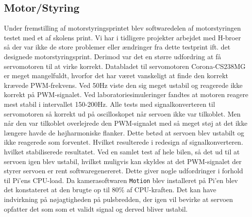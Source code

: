 \subsection{Motor/Styring} \label{sec:hwi_motor_styring}
Under fremstilling af motorstyringsprintet blev softwaredelen af motorstyringen testet med et af skolens print. 
Vi har i tidligere projekter arbejdet med H-broer så der var ikke de store problemer eller ændringer fra dette testprint ift. det designede motorstyringsprint.
Derimod var det en større udfordring at få servomotoren til at virke korrekt.  
Databladet til servomotoren Corona-CS238MG \cite{lib:Corona-CS238MG} er meget mangelfuldt, hvorfor det har været vanskeligt at finde den korrekt krævede PWM-frekvens. 
Ved 50Hz viste den sig meget ustabil og reagerede ikke korrekt på PWM-signalet. 
Ved laboratoriesimuleringer fandtes at motoren reagere mest stabil i intervallet 150-200Hz. 
Alle tests med signalkonverteren til servomotoren så korrekt ud på oscilloskopet når servoen ikke var tilkoblet. 
Men når den var tilkoblet overlejrede den PWM-signalet med så meget støj at det ikke længere havde de højharmoniske flanker. 
Dette betød at servoen blev ustabilt og ikke reagerede som forventet. 
Hvilket resulterede i redesign af signalkonverteren. 
hvilket stabiliserede resultatet.
Ved en samlet test af hele bilen, så det ud til at servoen igen blev ustabil, hvilket muligvis kan skyldes at det PWM-signalet der styrer servoen er rent softwaregenereret. 
Dette giver nogle udfordringer i forhold til Pi'ens CPU-load. 
Da kamerasoftwaren \texttt{Motion} blev installeret på Pi'en blev det konstateret at den brugte op til 80\% af CPU-kraften. 
Det kan have indvirkning på nøjagtigheden på pulsbredden, der igen vil bevirke at servoen opfatter det som som et validt signal og derved bliver ustabil.

